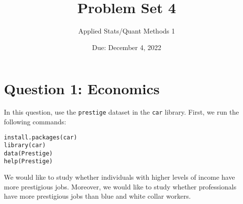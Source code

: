 \documentclass[12pt,letterpaper]{article}
\title{Problem Set 4}
\date{Due: December 4, 2022}
\author{Applied Stats/Quant Methods 1}
\begin{document}
	\maketitle
	\vspace{.25cm}
\section*{Question 1: Economics}
\vspace{.25cm}
\noindent 	
In this question, use the \texttt{prestige} dataset in the \texttt{car} library. First, we  run the following commands:

\begin{verbatim}
install.packages(car)
library(car)
data(Prestige)
help(Prestige)
\end{verbatim} 


\noindent We would like to study whether individuals with higher levels of income have more prestigious jobs. Moreover, we would like to study whether professionals have more prestigious jobs than blue and white collar workers.
\end{document}
